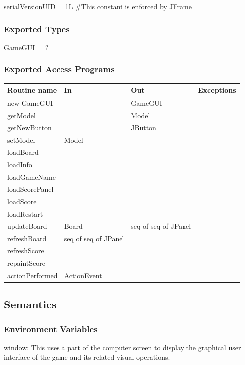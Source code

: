 \documentclass[12pt]{article}
\begin{document}
serialVersionUID = 1L   \#This constant is enforced by JFrame

\subsubsection* {Exported Types}

GameGUI = ?

\subsubsection* {Exported Access Programs}

\begin{tabular}{| l | l | l | p{5cm} |}
\hline
\textbf{Routine name} & \textbf{In} & \textbf{Out} & \textbf{Exceptions}\\
\hline
new GameGUI & & GameGUI & ~\\
\hline
getModel & & Model & ~\\
\hline
getNewButton & & JButton & ~\\
\hline
setModel & Model & & ~\\
\hline
loadBoard & & & ~\\
\hline
loadInfo & & & ~\\
\hline
loadGameName & & & ~\\
\hline
loadScorePanel & & & ~\\
\hline
loadScore & & & ~\\
\hline
loadRestart & & & ~\\
\hline
updateBoard & Board & seq of seq of JPanel & ~\\
\hline
refreshBoard & seq of seq of JPanel & & ~\\
\hline
refreshScore & & & ~\\
\hline
repaintScore & & & ~\\
\hline
actionPerformed & ActionEvent & & ~\\
\hline
\end{tabular}

\subsection* {Semantics}

\subsubsection* {Environment Variables}
window: This uses a part of the computer screen to display the graphical user interface of the game and its related visual operations.
\end{document}
